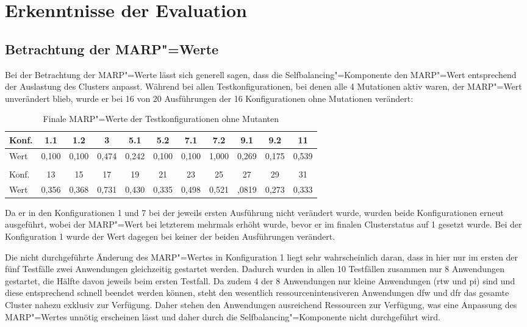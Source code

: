 \section{Erkenntnisse der Evaluation}
\label{sec:evaluationResults}


\subsection{Betrachtung der \ac{MARP}"=Werte}
\label{sec:marpValueResults}

Bei der Betrachtung der \ac{MARP}"=Werte lässt sich generell sagen, dass die Selfbalancing"=Komponente den \ac{MARP}"=Wert entsprechend der Auslastung des Clusters anpasst.
Während bei allen Testkonfigurationen, bei denen alle 4 Mutationen aktiv waren, der \ac{MARP}"=Wert unverändert blieb, wurde er bei 16 von 20 Ausführungen der 16 Konfigurationen ohne Mutationen verändert:

\begin{table}[h]
    \begin{tabular}{l|c|c|c|c|c|c|c|c|c|c}
    	Konf. &  1.1  &  1.2  &   3   &  5.1  &  5.2  &  7.1  &  7.2  &  9.1  &  9.2  &  11   \\ \hline
    	Wert  & 0,100 & 0,100 & 0,474 & 0,242 & 0,100 & 0,100 & 1,000 & 0,269 & 0,175 & 0,539 \\
    	\multicolumn{11}{c}{} \\
    	Konf. &  13   &  15   &  17   &  19   &  21   &  23   &  25   &  27   &  29   &  31   \\ \hline
    	Wert  & 0,356 & 0,368 & 0,731 & 0,430 & 0,335 & 0,498 & 0,521 & ,0819 & 0,273 & 0,333
    \end{tabular}
    \caption{Finale \ac{MARP}"=Werte der Testkonfigurationen ohne Mutanten}
    \label{tab:finalMarpValues}
\end{table}

Da er in den Konfigurationen 1 und 7 bei der jeweils ersten Ausführung nicht verändert wurde, wurden beide Konfigurationen erneut ausgeführt, wobei der \ac{MARP}"=Wert bei letzterem mehrmals erhöht wurde, bevor er im finalen Clusterstatus auf 1 gesetzt wurde.
Bei der Konfiguration 1 wurde der Wert dagegen bei keiner der beiden Ausführungen verändert.

Die nicht durchgeführte Änderung des \ac{MARP}"=Wertes in Konfiguration 1 liegt sehr wahrscheinlich daran, dass in hier nur im ersten der fünf Testfälle zwei Anwendungen gleichzeitig gestartet werden.
Dadurch wurden in allen 10 Testfällen zusammen nur 8 Anwendungen gestartet, die Hälfte davon jeweils beim ersten Testfall.
Da zudem 4 der 8 Anwendungen nur kleine Anwendungen (\acl{rtw} und \acl{pi}) sind und diese entsprechend schnell beendet werden können, steht den wesentlich ressourcenintensiveren Anwendungen \acl{dfw} und \acl{dfr} das gesamte Cluster nahezu exklusiv zur Verfügung.
Daher stehen den Anwendungen ausreichend Ressourcen zur Verfügung, was eine Anpassung des \ac{MARP}"=Wertes unnötig erscheinen lässt und daher durch die Selfbalancing"=Komponente nicht durchgeführt wird.

